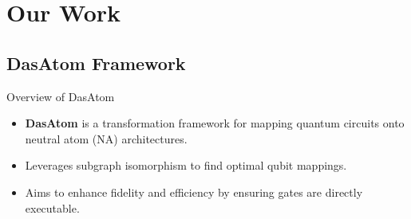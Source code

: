 \section{Our Work}

\subsection{DasAtom Framework}

\begin{frame}{Overview of DasAtom}
    \begin{itemize}
        \item \textbf{DasAtom} is a transformation framework for mapping quantum circuits onto neutral atom (NA) architectures.
        \item Leverages subgraph isomorphism to find optimal qubit mappings.
        \item Aims to enhance fidelity and efficiency by ensuring gates are directly executable.
    \end{itemize}
\end{frame}

